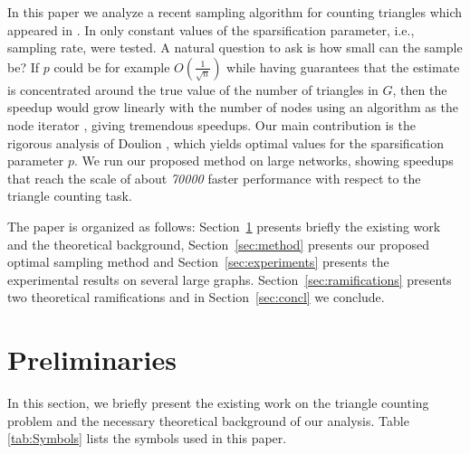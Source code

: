 \documentclass{llncs}
\newcommand{\hide}[1]{}
\begin{document}
In this paper we analyze a recent sampling algorithm for counting triangles
which appeared in \cite{Tsourakakiskdd09}. In \cite{Tsourakakiskdd09} 
only constant values of the sparsification parameter, i.e., sampling rate, 
were tested. A natural question to ask is how small can the sample be? 
If $p$ could be for example $O(\frac{1}{\sqrt{n}})$ while having guarantees that the estimate
is concentrated around the true value of the number of triangles in $G$, then 
the speedup would grow linearly with the number of nodes using an algorithm as the node iterator \cite{Tsourakakiskdd09}, 
giving tremendous speedups. 
Our main contribution is the rigorous analysis of Doulion \cite{Tsourakakiskdd09}, which yields optimal values
for the sparsification parameter $p$. We run our proposed method on large networks, 
showing speedups that reach the scale of about \emph{70000} faster performance with respect to the triangle counting task. 

The paper is organized as follows: Section~\ref{sec:prelim} presents briefly
the existing work and the theoretical background, Section~\ref{sec:method} 
presents our proposed optimal sampling method and Section~\ref{sec:experiments} presents
the experimental results on several large graphs. Section~\ref{sec:ramifications} presents 
two theoretical ramifications and in Section~\ref{sec:concl} we conclude.


\section{Preliminaries}
\label{sec:prelim}

In this section, we briefly present the existing work on the triangle counting problem 
and the necessary theoretical background of our analysis. \hide{We end this section by briefly 
describing Hadoop, our implementation platform.} Table \ref{tab:Symbols} lists the symbols used in this paper.
\end{document}
